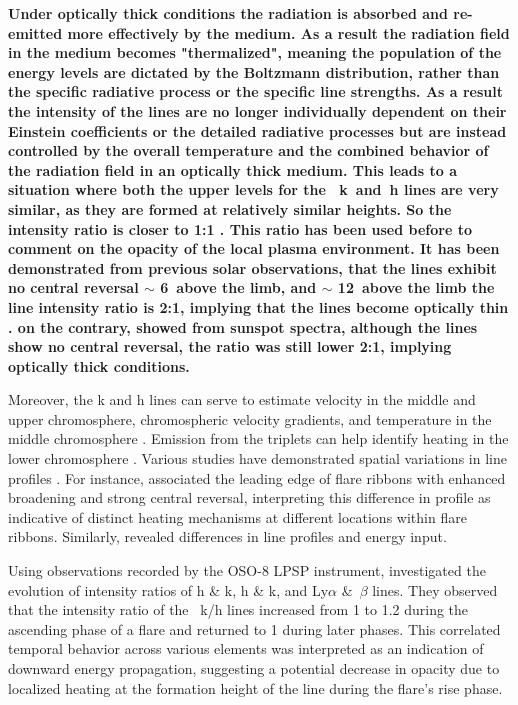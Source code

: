 {\bf Under optically thick conditions the radiation is absorbed and re-emitted more effectively by the medium. As a result the radiation field in the medium becomes "thermalized", meaning the population of the energy levels are dictated by the Boltzmann distribution, rather than the specific radiative process or the specific line strengths. As a result the intensity of the lines are no longer individually dependent on their Einstein coefficients or the detailed radiative processes but are instead controlled by the overall temperature and the combined behavior of the radiation field in an optically thick medium. This leads to a situation where both the upper levels for the ~k~and~h lines are very similar, as they are formed at relatively similar heights. So the intensity ratio is closer to 1:1 \citep{kerr15, levens19}. This ratio has been used before to comment on the opacity of the local plasma environment. It has been demonstrated from previous solar observations, that the  lines exhibit no central reversal $\sim$ 6\arcsec~above the limb, and $\sim$ 12\arcsec~above the limb the line intensity ratio is 2:1, implying that the lines become optically thin \citep{doschek_n_feldman_77, feldman_n_doscheck_77}. on the contrary, \cite{kneer81} showed from sunspot spectra, although the  lines show no central reversal, the ratio was still lower 2:1, implying optically thick conditions.
}

Moreover, the   k and h lines can serve to estimate velocity in the middle and upper chromosphere, chromospheric velocity gradients, and temperature in the middle chromosphere \citep{leenarts13a,leenarts13b,pereira13}. Emission from the   triplets can help identify heating in the lower chromosphere \citep{pereira15}. Various studies have demonstrated spatial variations in   line profiles \citep{dalda23,panos18}. For instance, \cite{polito23} associated the leading edge of flare ribbons with enhanced broadening and strong central reversal, interpreting this difference in profile as indicative of distinct heating mechanisms at different locations within flare ribbons. Similarly, \cite{panos21,panos21_2} revealed differences in line profiles and energy input.

Using observations recorded by the OSO-8 LPSP instrument, \citep{lemaire84} investigated the evolution of intensity ratios of   h \& k,  h \& k, and Ly$\alpha$ \&~$\beta$ lines. They observed that the intensity ratio of the ~k/h lines increased from 1 to 1.2 during the ascending phase of a flare and returned to 1 during later phases. This correlated temporal behavior across various elements was interpreted as an indication of downward energy propagation, suggesting a potential decrease in opacity due to localized heating at the formation height of the  line during the flare's rise phase.

